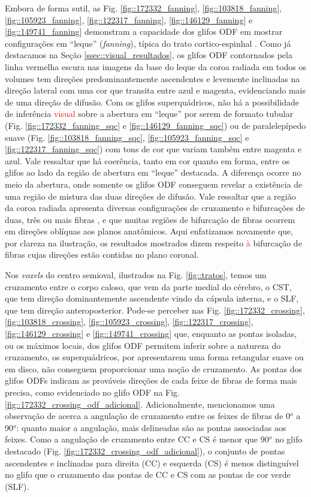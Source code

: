 Embora de forma sutil, as Fig.
\ref{fig::172332_fanning},
\ref{fig::103818_fanning},
\ref{fig::105923_fanning},
\ref{fig::122317_fanning},
\ref{fig::146129_fanning} e
\ref{fig::149741_fanning} demonstram a capacidade dos glifos ODF em mostrar configurações em ``leque'' (\textit{fanning}), típica do trato cortico-espinhal \cite{fortin2012, wang2019}. Como já destacamos na Seção \ref{ssec::visual_resultados}, os glifos ODF contornados pela linha vermelha escura nas imagens da base do leque da coroa radiada em todos os volumes tem  direções predominantemente ascendentes e levemente inclinadas na direção lateral com uma cor que transita entre azul e magenta, evidenciando mais de uma direção de difusão. Com os glifos superquádricos, não há a possibilidade de inferência \textcolor{red}{visual} sobre a abertura em ``leque'' por serem de formato tubular (Fig. \ref{fig::172332_fanning_sqc} e \ref{fig::146129_fanning_sqc}) ou de paralelepípedo suave (Fig. \ref{fig::103818_fanning_sqc}, \ref{fig::105923_fanning_sqc} e \ref{fig::122317_fanning_sqc}) com tons de cor que variam também entre magenta e azul. Vale ressaltar que há coerência, tanto em cor quanto em forma, entre os glifos ao lado da região de abertura em ``leque'' destacada. A diferença ocorre no meio da abertura, onde somente os glifos ODF conseguem revelar a existência de uma região de mistura das duas direções de difusão. Vale ressaltar que a região da coroa radiada apresenta diversas configurações de cruzamento e bifurcações de duas, três ou mais fibras \cite{schilling2017}, e que muitas regiões de bifurcação de fibras ocorrem em direções oblíquas aos planos anatômicos. Aqui enfatizamos novamente que, por clareza na ilustração, os resultados mostrados dizem respeito \textcolor{red}{à} bifurcação de fibras cujas direções estão contidas no plano coronal.

Nos \textit{voxels} do centro semioval, ilustrados na Fig. \ref{fig::tratos},  temos um cruzamento entre o corpo caloso, que vem da parte medial do cérebro,
o CST, que tem direção dominantemente ascendente vindo da cápsula interna, e o SLF, que tem direção anteroposterior. Pode-se perceber nas Fig.
\ref{fig::172332_crossing},
\ref{fig::103818_crossing},
\ref{fig::105923_crossing},
\ref{fig::122317_crossing},
\ref{fig::146129_crossing} e
\ref{fig::149741_crossing} que, 
enquanto as pontas isoladas, ou os máximos locais, dos glifos ODF permitem inferir sobre a natureza do cruzamento, os superquádricos, por apresentarem uma forma retangular suave ou em disco, não conseguem proporcionar uma noção de cruzamento. As pontas dos glifos ODFs indicam as prováveis direções de cada feixe de fibras de forma mais precisa, como evidenciado no glifo ODF na Fig. \ref{fig::172332_crossing_odf_adicional}. Adicionalmente, mencionamos uma observação de  acerca a angulação de cruzamento entre os feixes de fibras de 0$^o$ a 90$^o$: quanto maior a angulação, mais delineadas são as pontas associadas aos feixes. Como a angulação de cruzamento entre CC e CS é menor que 90$^o$ no glifo destacado (Fig. \ref{fig::172332_crossing_odf_adicional}), o conjunto de pontas ascendentes e inclinadas para direita (CC) e esquerda (CS) é menos distinguível no glifo que o cruzamento das pontas de CC e CS com as pontas de cor verde (SLF).

